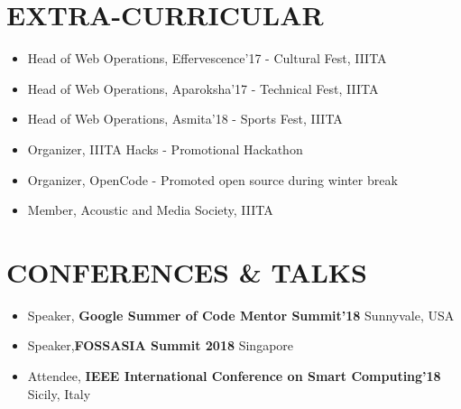 \documentclass[margin, 7pt]{res} %
\begin{document}
\begin{resume}
\section{EXTRA-CURRICULAR}
\begin{itemize}
    \item Head of Web Operations, Effervescence'17 - Cultural Fest, IIITA
    \item Head of Web Operations, Aparoksha'17 - Technical Fest, IIITA
    \item Head of Web Operations, Asmita'18 - Sports Fest, IIITA
    \item Organizer, IIITA Hacks - Promotional Hackathon
    \item Organizer, OpenCode - Promoted open source during winter break
    \item Member, Acoustic and Media Society, IIITA
\end{itemize}

\section{CONFERENCES \& TALKS}
\begin{itemize}
    \item Speaker, \textbf{Google Summer of Code Mentor Summit'18} \hfill{Sunnyvale, USA}
    \item Speaker,\textbf{FOSSASIA Summit 2018} \hfill{Singapore}
    \item Attendee, \textbf{IEEE International Conference on Smart Computing'18} \hfill{Sicily, Italy}
\end{itemize}



\end{resume}
\end{document}
